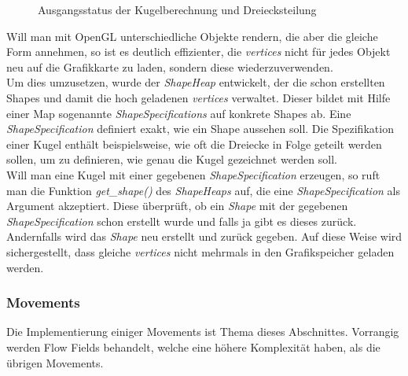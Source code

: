 \documentclass[11pt,a4paper]{article}
\begin{document}
\begin{center}
\begin{figure}[!ht]
\centering
\vspace{20pt}
\caption[Ausgangsstatus der Kugelberechnung und Dreiecksteilung]{Ausgangsstatus der Kugelberechnung und Dreiecksteilung}
\label{fig:kugelVertices}
\end{figure}
\end{center}
\noindent
Will man mit OpenGL unterschiedliche Objekte rendern, die aber die gleiche Form annehmen, so ist es deutlich effizienter, die \textit{vertices} nicht für jedes Objekt neu auf die Grafikkarte zu laden, sondern diese wiederzuverwenden.\\
Um dies umzusetzen, wurde der \textit{ShapeHeap} entwickelt, der die schon erstellten Shapes und damit die hoch geladenen \textit{vertices} verwaltet. Dieser bildet mit Hilfe einer Map sogenannte \textit{ShapeSpecifications} auf konkrete Shapes ab. Eine \textit{ShapeSpecification} definiert exakt, wie ein Shape aussehen soll. Die Spezifikation einer Kugel enthält beispielsweise, wie oft die Dreiecke in Folge geteilt werden sollen, um zu definieren, wie genau die Kugel gezeichnet werden soll.\\
Will man eine Kugel mit einer gegebenen \textit{ShapeSpecification} erzeugen, so ruft man die Funktion \mbox{\textit{get\_shape()}} des \mbox{\textit{ShapeHeaps}} auf, die eine \textit{ShapeSpecification} als Argument akzeptiert. Diese überprüft, ob ein \textit{Shape} mit der gegebenen \textit{ShapeSpecification} schon erstellt wurde und falls ja gibt es dieses zurück. Andernfalls wird das \textit{Shape} neu erstellt und zurück gegeben. Auf diese Weise wird sichergestellt, dass gleiche \textit{vertices} nicht mehrmals in den Grafikspeicher geladen werden.

\subsubsection{Movements}
Die Implementierung einiger Movements ist Thema dieses Abschnittes. Vorrangig werden Flow Fields behandelt, welche eine höhere Komplexität haben, als die übrigen Movements.
\end{document}
